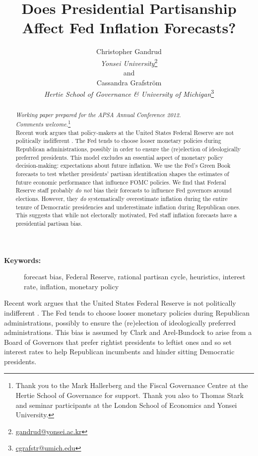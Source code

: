 \documentclass[a4paper]{article}\usepackage{graphicx, color}
\title{Does Presidential Partisanship Affect Fed Inflation Forecasts?}
\author{Christopher Gandrud \\
                {\emph{Yonsei University}}\footnote{\href{mailto:gandrud@yonsei.ac.kr}{gandrud@yonsei.ac.kr}} \\
                and \\
            Cassandra Grafstr\"{o}m \\
                {\emph{Hertie School of Governance \& University of Michigan}}\footnote{\href{mailto:cgrafstr@umich.edu}{cgrafstr@umich.edu}}}
\begin{document}
\maketitle

\begin{abstract}
\noindent\emph{Working paper prepared for the APSA Annual Conference 2012. \\ Comments welcome.}\footnote{Thank you to the Mark Hallerberg and the Fiscal Governance Centre at the Hertie School of Governance for support. Thank you also to Thomas Stark and seminar participants at the London School of Economics and Yonsei University.} \\[0.2cm]

Recent work argues that policy-makers at the United States Federal Reserve are not politically indifferent \citep{Clark2012}. The Fed tends to choose looser monetary policies during Republican administrations, possibly in order to ensure the (re)election of ideologically preferred presidents. This model excludes an essential aspect of monetary policy decision-making: expectations about future inflation. We use the Fed's Green Book forecasts to test whether presidents' partisan identification shapes the estimates of future economic performance that influence FOMC policies. We find that Federal Reserve staff probably {\emph{do not}} bias their forecasts to influence Fed governors around elections. However, they {\emph{do}} systematically overestimate inflation during the entire tenure of Democratic presidencies and underestimate inflation during Republican ones. This suggests that while not electorally motivated, Fed staff inflation forecasts have a presidential partisan bias.

\end{abstract}

\begin{description}
  \item [{\textbf{Keywords:}}] forecast bias, Federal Reserve, rational partisan cycle, heuristics, interest rate, inflation, monetary policy
\end{description}

\vspace{0.3cm}

Recent work argues that the United States Federal Reserve is not politically indifferent \citep{Clark2012}. The Fed tends to choose looser monetary policies during Republican administrations, possibly to ensure the (re)election of ideologically preferred administrations. This bias is assumed by Clark and Arel-Bundock to arise from a Board of Governors that prefer rightist presidents to leftist ones and so set interest rates to help Republican incumbents and hinder sitting Democratic presidents. 
\end{document}
